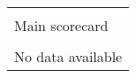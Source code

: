 \begin{tabular}{l}
\toprule\\
Main scorecard\\
\midrule\\
No data available\\
\bottomrule
\end{tabular}
